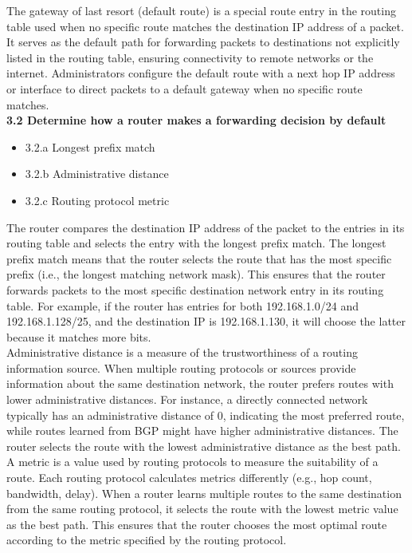 \documentclass{article}
\begin{document}
	The gateway of last resort (default route) is a special route entry in the routing table used when no specific route matches the destination IP address of a packet. It serves as the default path for forwarding packets to destinations not explicitly listed in the routing table, ensuring connectivity to remote networks or the internet. Administrators configure the default route with a next hop IP address or interface to direct packets to a default gateway when no specific route matches.\\
  
\noindent\textbf{3.2 Determine how a router makes a forwarding decision by default}
\begin{itemize}
\item 3.2.a Longest prefix match
\item 3.2.b Administrative distance
\item 3.2.c Routing protocol metric
\end{itemize}

	The router compares the destination IP address of the packet to the entries in its routing table and selects the entry with the longest prefix match. The longest prefix match means that the router selects the route that has the most specific prefix (i.e., the longest matching network mask). This ensures that the router forwards packets to the most specific destination network entry in its routing table. For example, if the router has entries for both 192.168.1.0/24 and 192.168.1.128/25, and the destination IP is 192.168.1.130, it will choose the latter because it matches more bits.\\

	Administrative distance is a measure of the trustworthiness of a routing information source. When multiple routing protocols or sources provide information about the same destination network, the router prefers routes with lower administrative distances. For instance, a directly connected network typically has an administrative distance of 0, indicating the most preferred route, while routes learned from BGP might have higher administrative distances. The router selects the route with the lowest administrative distance as the best path.\\
	
	A metric is a value used by routing protocols to measure the suitability of a route. Each routing protocol calculates metrics differently (e.g., hop count, bandwidth, delay). When a router learns multiple routes to the same destination from the same routing protocol, it selects the route with the lowest metric value as the best path. This ensures that the router chooses the most optimal route according to the metric specified by the routing protocol.\\
  
\end{document}
